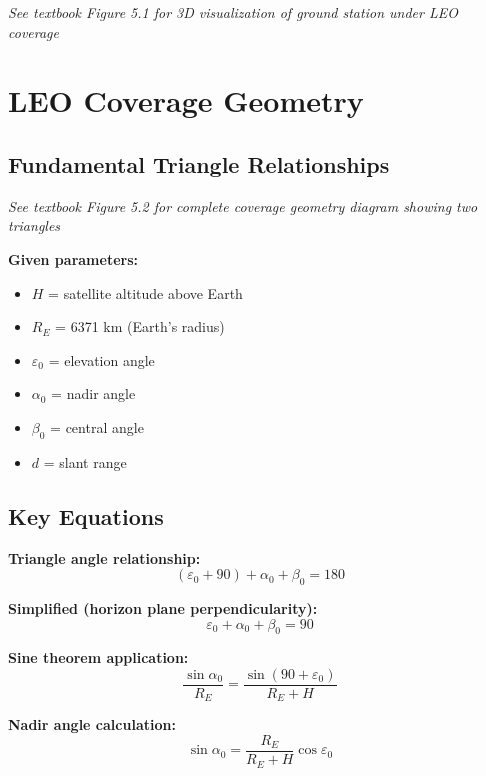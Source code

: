 \documentclass[11pt,letterpaper]{article}
\begin{document}
\textit{See textbook Figure 5.1 for 3D visualization of ground station under LEO coverage}

\section{LEO Coverage Geometry}

\subsection{Fundamental Triangle Relationships}

\textit{See textbook Figure 5.2 for complete coverage geometry diagram showing two triangles}

\textbf{Given parameters:}
\begin{itemize}
    \item $H$ = satellite altitude above Earth
    \item $R_E$ = 6371 km (Earth's radius)
    \item $\varepsilon_0$ = elevation angle
    \item $\alpha_0$ = nadir angle
    \item $\beta_0$ = central angle
    \item $d$ = slant range
\end{itemize}

\subsection{Key Equations}

\textbf{Triangle angle relationship:}
\begin{equation}
(\varepsilon_0 + 90) + \alpha_0 + \beta_0 = 180
\end{equation}

\textbf{Simplified (horizon plane perpendicularity):}
\begin{equation}
\varepsilon_0 + \alpha_0 + \beta_0 = 90
\end{equation}

\textbf{Sine theorem application:}
\begin{equation}
\frac{\sin \alpha_0}{R_E} = \frac{\sin(90 + \varepsilon_0)}{R_E + H}
\end{equation}

\textbf{Nadir angle calculation:}
\begin{equation}
\sin \alpha_0 = \frac{R_E}{R_E + H} \cos \varepsilon_0
\end{equation}
\end{document}

